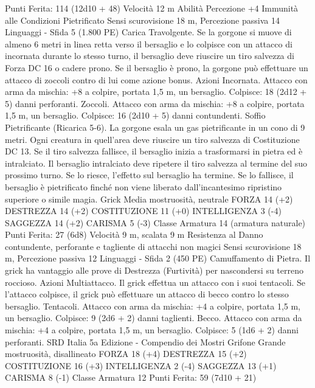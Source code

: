 \begin{multicols}{2}
\hspace*{0pt}\hfill{Punti Ferita}: 114 (12d10 + 48)
Velocità 12 m
Abilità Percezione +4
Immunità alle Condizioni Pietrificato
Sensi scurovisione 18 m, Percezione passiva 14
Linguaggi -
Sfida 5 (1.800 PE)
Carica Travolgente. Se la gorgone si muove di almeno 6 metri in
linea retta verso il bersaglio e lo colpisce con un attacco di incornata
durante lo stesso turno, il bersaglio deve riuscire un tiro salvezza di
Forza DC 16 o cadere prono. Se il bersaglio è prono, la gorgone può
effettuare un attacco di zoccoli contro di lui come azione bonus.
Azioni
Incornata. Attacco con arma da mischia: +8 a colpire, portata
1,5 m, un bersaglio.
Colpisce: 18 (2d12 + 5) danni perforanti.
Zoccoli. Attacco con arma da mischia: +8 a colpire, portata 1,5
m, un bersaglio.
Colpisce: 16 (2d10 + 5) danni contundenti.
Soffio Pietrificante (Ricarica 5-6). La gorgone esala un gas
pietrificante in un cono di 9 metri. Ogni creatura in quell’area
deve riuscire un tiro salvezza di Costituzione DC 13. Se il tiro
salvezza fallisce, il bersaglio inizia a trasformarsi in pietra ed è
intralciato. Il bersaglio intralciato deve ripetere il tiro salvezza al
termine del suo prossimo turno. Se lo riesce, l’effetto sul
bersaglio ha termine. Se lo fallisce, il bersaglio è pietrificato
finché non viene liberato dall’incantesimo ripristino superiore o
simile magia.
Grick
Media mostruosità, neutrale
FORZA 14 (+2)
DESTREZZA 14 (+2)
COSTITUZIONE 11 (+0)
INTELLIGENZA 3 (-4)
SAGGEZZA 14 (+2)
CARISMA 5 (-3)
Classe Armatura 14 (armatura naturale)
\hspace*{0pt}\hfill{Punti Ferita}: 27 (6d8)
Velocità 9 m, scalata 9 m
Resistenza al Danno contundente, perforante e tagliente di
attacchi non magici
Sensi scurovisione 18 m, Percezione passiva 12
Linguaggi -
Sfida 2 (450 PE)
Camuffamento di Pietra. Il grick ha vantaggio alle prove di
Destrezza (Furtività) per nascondersi su terreno roccioso.
Azioni
Multiattacco. Il grick effettua un attacco con i suoi tentacoli. Se
l’attacco colpisce, il grick può effettuare un attacco di becco
contro lo stesso bersaglio.
Tentacoli. Attacco con arma da mischia: +4 a colpire, portata 1,5
m, un bersaglio.
Colpisce: 9 (2d6 + 2) danni taglienti.
Becco. Attacco con arma da mischia: +4 a colpire, portata 1,5 m,
un bersaglio.
Colpisce: 5 (1d6 + 2) danni perforanti.
SRD Italia 5a Edizione - Compendio dei Mostri
Grifone
Grande mostruosità, disallineato
FORZA 18 (+4)
DESTREZZA 15 (+2)
COSTITUZIONE 16 (+3)
INTELLIGENZA 2 (-4)
SAGGEZZA 13 (+1)
CARISMA 8 (-1)
Classe Armatura 12
\hspace*{0pt}\hfill{Punti Ferita}: 59 (7d10 + 21)

\end{multicols}
